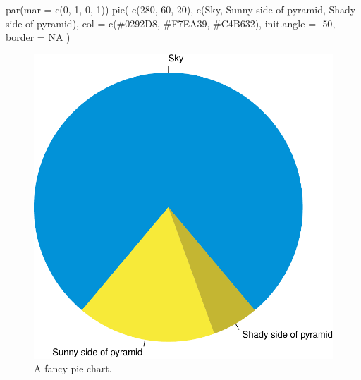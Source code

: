 \documentclass[
]{book}
\newenvironment{Shaded}{\begin{snugshade}}{\end{snugshade}}
\newcommand{\AttributeTok}[1]{\textcolor[rgb]{0.77,0.63,0.00}{#1}}
\newcommand{\ConstantTok}[1]{\textcolor[rgb]{0.00,0.00,0.00}{#1}}
\newcommand{\DecValTok}[1]{\textcolor[rgb]{0.00,0.00,0.81}{#1}}
\newcommand{\FunctionTok}[1]{\textcolor[rgb]{0.00,0.00,0.00}{#1}}
\newcommand{\NormalTok}[1]{#1}
\newcommand{\SpecialCharTok}[1]{\textcolor[rgb]{0.00,0.00,0.00}{#1}}
\newcommand{\StringTok}[1]{\textcolor[rgb]{0.31,0.60,0.02}{#1}}
\begin{document}
\begin{Shaded}
\begin{Highlighting}[]
\FunctionTok{par}\NormalTok{(}\AttributeTok{mar =} \FunctionTok{c}\NormalTok{(}\DecValTok{0}\NormalTok{, }\DecValTok{1}\NormalTok{, }\DecValTok{0}\NormalTok{, }\DecValTok{1}\NormalTok{))}
\FunctionTok{pie}\NormalTok{(}
  \FunctionTok{c}\NormalTok{(}\DecValTok{280}\NormalTok{, }\DecValTok{60}\NormalTok{, }\DecValTok{20}\NormalTok{),}
  \FunctionTok{c}\NormalTok{(}\StringTok{\textquotesingle{}Sky\textquotesingle{}}\NormalTok{, }\StringTok{\textquotesingle{}Sunny side of pyramid\textquotesingle{}}\NormalTok{, }\StringTok{\textquotesingle{}Shady side of pyramid\textquotesingle{}}\NormalTok{),}
  \AttributeTok{col =} \FunctionTok{c}\NormalTok{(}\StringTok{\textquotesingle{}\#0292D8\textquotesingle{}}\NormalTok{, }\StringTok{\textquotesingle{}\#F7EA39\textquotesingle{}}\NormalTok{, }\StringTok{\textquotesingle{}\#C4B632\textquotesingle{}}\NormalTok{),}
  \AttributeTok{init.angle =} \SpecialCharTok{{-}}\DecValTok{50}\NormalTok{, }\AttributeTok{border =} \ConstantTok{NA}
\NormalTok{)}
\end{Highlighting}
\end{Shaded}

\begin{figure}
\includegraphics[width=1\linewidth]{Rmarkdown_files/figure-latex/pie-1} \caption{A fancy pie chart.}\label{fig:pie}
\end{figure}
\end{document}
